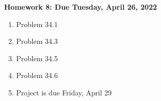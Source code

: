 \documentclass[11pt]{article}
\begin{document}
\newcommand{\problem}[1]{%
\item {#1}
}
\newcommand{\probl}[1]{\label{#1}}
\def\be{\begin{equation}}
\def\ee{\end{equation}}
\def\bea{\begin{eqnarray}}
\def\eea{\end{eqnarray}}
\newcommand{\vs}{\nonumber\\}
\def\across{a^\times}
\def\tcross{T^\times}
\def\ccross{C^\times}
\newcommand{\ec}[1]{Eq.~(\ref{eq:#1})}
\newcommand{\eec}[2]{Eqs.~(\ref{eq:#1}) and (\ref{eq:#2})}
\newcommand{\Ec}[1]{(\ref{eq:#1})}
\newcommand{\eql}[1]{\label{eq:#1}}
\newcommand{\sfig}[2]{
\texttt{[image: \#1]}
        }
\newcommand{\sfigr}[2]{
\texttt{[image: \#1]}
        }
\newcommand{\sfigra}[2]{
\texttt{[image: \#1]}
        }
\newcommand{\Sfig}[2]{
   \begin{figure}[thbp]
   \begin{center}
    \sfig{#1.pdf}{0.5\columnwidth}
    \caption{{\small #2}}
    \label{fig:#1}
     \end{center}
   \end{figure}
}

\newcommand\dirac{\delta_D}
\newcommand{\rf}[1]{\ref{fig:#1}}
\newcommand\rhoc{\rho_{\rm cr}}
\newcommand\zs{D_S}
\newcommand\dts{\Delta t_{\rm Sh}}
\newcommand\zle{D_L}
\newcommand\zsl{D_{SL}}
\newcommand\sh{\gamma}
\newcommand\surb{\mathcal{S}}
\newcommand\psf{\mathcal{P}}
\newcommand\spsf{\sigma_{\rm PSF}}
\newcommand\bei{\begin{itemize}}
\newcommand\eei{\end{itemize}}
\begin{centering}
{\bf Homework 8: Due Tuesday, April 26, 2022}
\end{centering}

\begin{enumerate}

\problem{Problem 34.1}
\problem{Problem 34.3}
\problem{Problem 34.5}
\problem{Problem 34.6}
\problem{Project is due Friday, April 29}

\end{enumerate}
\end{document}
